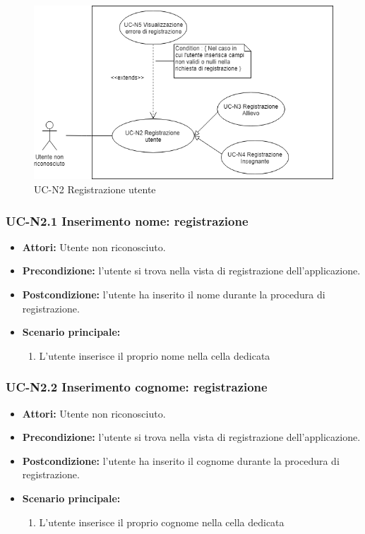 \begin{figure}[h]
	\centering
	\includegraphics[scale=0.7]{images/UC-N2.png}
	\caption{UC-N2 Registrazione utente}
\end{figure}

\subsubsection{UC-N2.1 Inserimento nome: registrazione}
\begin{itemize}
	\item \textbf{Attori: }Utente non riconosciuto.
	\item \textbf{Precondizione: }l'utente si trova nella vista 		di registrazione dell'applicazione.
	\item \textbf{Postcondizione: }l'utente ha inserito il nome durante la procedura di registrazione.
	\item \textbf{Scenario principale: }
	\begin{enumerate}
		\item L'utente inserisce il proprio nome nella cella 				dedicata
	\end{enumerate}
\end{itemize}

\subsubsection{UC-N2.2 Inserimento cognome: registrazione}
\begin{itemize}
	\item \textbf{Attori: }Utente non riconosciuto.
	\item \textbf{Precondizione: }l'utente si trova nella vista 		di registrazione dell'applicazione.
	\item \textbf{Postcondizione: }l'utente ha inserito il cognome durante la procedura di registrazione.
	\item \textbf{Scenario principale: }
	\begin{enumerate}
		\item L'utente inserisce il proprio cognome nella cella 				dedicata
	\end{enumerate}
\end{itemize}

